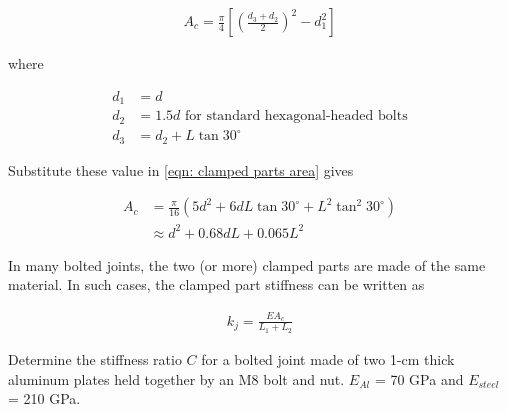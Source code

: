 \documentclass[
10pt,
a4paper,
openany,
svgnames,
]{book}
\begin{document}
\begin{align}
  A_c = \frac{\pi}{4} \left[ \left( \frac{d_3 + d_2}{2} \right)^2 - d_1^2 \right] \label{eqn: clamped parts area}
\end{align}

where 

\begin{align*}
  d_1 &= d \\
  d_2 &= 1.5d \text{ for standard hexagonal-headed bolts} \\
  d_3 &= d_2 + L \tan 30^{\circ} 
\end{align*}

Substitute these value in \cref{eqn: clamped parts area} gives

\begin{align}
  A_c &= \frac{\pi}{16}(5d^2 + 6dL \tan 30^{\circ} + L^2 \tan^2 30^{\circ}) \nonumber \\
      &\approx d^2 + 0.68dL + 0.065L^2 \label{eqn: clamped parts area approx}
\end{align}

In many bolted joints, the two (or more) clamped parts are made of the same material. In such cases, the clamped part stiffness can be written as

\begin{align}
  k_j = \frac{EA_c}{L_1+L_2}
\end{align}

\begin{example} Determine the stiffness ratio $C$ for a bolted joint made of two 1-cm thick aluminum plates held together by an M8 bolt and nut. $E_{Al}$ = 70 GPa and $E_{steel}$ = 210 GPa.
\end{example}
\end{document}

